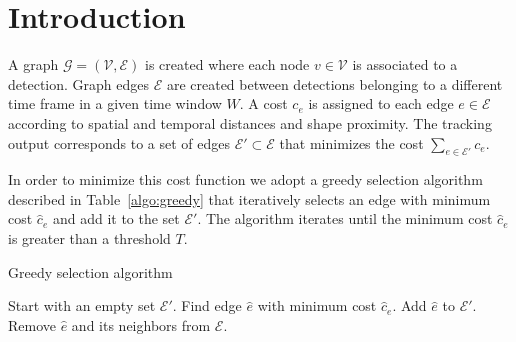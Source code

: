 \documentclass[12pt]{article}
\begin{document}
\maketitle


\section{Introduction}


A graph $\mathcal{G}=(\mathcal{V},\mathcal{E})$ is created where each node $v \in \mathcal{V}$ is associated to a detection. Graph edges $\mathcal{E}$ are created between detections belonging to a different time frame in a given time window $W$. A cost $c_e$ is assigned to each edge $e \in \mathcal{E}$ according to spatial and temporal distances and shape proximity. The tracking output corresponds to a set of edges $\mathcal{E'} \subset \mathcal{E}$ that minimizes the cost $\sum_{e \in \mathcal{E'}}  c_e$.

In order to minimize this cost function we adopt a greedy selection algorithm described in Table~\ref{algo:greedy} that iteratively selects an edge with minimum cost $\hat c_e$ and add it to the set $\mathcal{E}'$. The algorithm iterates until the minimum cost $\hat c_e$ is greater than a threshold $T$.

\begin{algorithm}[b]
\caption{Greedy selection algorithm}
\begin{algorithmic}[1]
\STATE Start with an empty set $\mathcal{E}'$.
\REPEAT
\STATE Find edge $\hat e$ with minimum cost $\hat c_e$.
\STATE Add $\hat e$ to $\mathcal{E}'$.
\STATE Remove $\hat e$ and its neighbors from $\mathcal{E}$.
\end{algorithmic}
\label{algo:greedy}
\end{algorithm}
\end{document}
